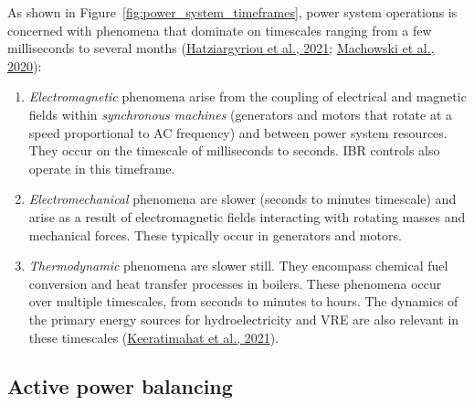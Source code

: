 \documentclass[12pt,a4paper,]{report}
\begin{document}
As shown in Figure~\ref{fig:power_system_timeframes}, power system
operations is concerned with phenomena that dominate on timescales
ranging from a few milliseconds to several months
(\protect\hyperlink{ref-hatziargyriouDefinitionClassificationPower2021}{Hatziargyriou
et al., 2021};
\protect\hyperlink{ref-machowskiPowerSystemDynamics2020}{Machowski et
al., 2020}):

\begin{enumerate}
\def\labelenumi{\arabic{enumi}.}
\item
  \emph{Electromagnetic} phenomena arise from the coupling of electrical
  and magnetic fields within \emph{synchronous machines} (generators and
  motors that rotate at a speed proportional to AC frequency) and
  between power system resources. They occur on the timescale of
  milliseconds to seconds. IBR controls also operate in this timeframe.
\item
  \emph{Electromechanical} phenomena are slower (seconds to minutes
  timescale) and arise as a result of electromagnetic fields interacting
  with rotating masses and mechanical forces. These typically occur in
  generators and motors.
\item
  \emph{Thermodynamic} phenomena are slower still. They encompass
  chemical fuel conversion and heat transfer processes in boilers. These
  phenomena occur over multiple timescales, from seconds to minutes to
  hours. The dynamics of the primary energy sources for hydroelectricity
  and VRE are also relevant in these timescales
  (\protect\hyperlink{ref-keeratimahatAnalysisShorttermOperational2021}{Keeratimahat
  et al., 2021}).
\end{enumerate}

\hypertarget{sec:lit_review-balancing}{%
\subsection{Active power balancing}\label{sec:lit_review-balancing}}
\end{document}
